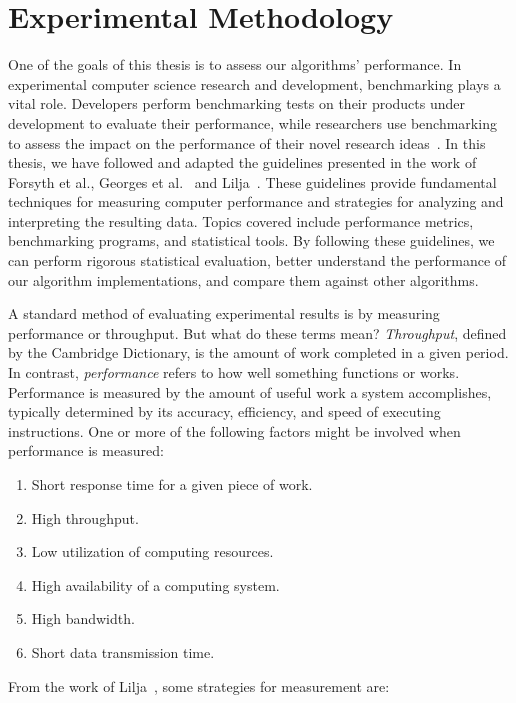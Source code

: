 \section{\label{sec:methodology}Experimental Methodology}

One of the goals of this thesis is to assess our algorithms' performance. In experimental computer science research and development, benchmarking plays a vital role. Developers perform benchmarking tests on their products under development to evaluate their performance, while researchers use benchmarking to assess the impact on the performance of their novel research ideas~\cite{DBLP_conf_oopsla_GeorgesBE07}.
In this thesis, we have followed and adapted the guidelines presented in the work of Forsyth et al.\cite{forsyth2018probability}, Georges et al.~\cite{DBLP_conf_oopsla_GeorgesBE07} and Lilja~\cite{lilja2005measuring}. These guidelines provide fundamental techniques for measuring computer performance and strategies for analyzing and interpreting the resulting data. Topics covered include performance metrics, benchmarking programs, and statistical tools. By following these guidelines, we can perform rigorous statistical evaluation, better understand the performance of our algorithm implementations, and compare them against other algorithms.

A standard method of evaluating experimental results is by measuring performance or throughput. But what do these terms mean? \emph{Throughput}, defined by the Cambridge Dictionary, is the amount of work completed in a given period. In contrast, \emph{performance} refers to how well something functions or works. Performance is measured by the amount of useful work a system accomplishes, typically determined by its accuracy, efficiency, and speed of executing instructions. One or more of the following factors might be involved when performance is measured:

\begin{enumerate}
\item Short response time for a given piece of work.
\item High throughput.
\item Low utilization of computing resources.
\item High availability of a computing system.
\item High bandwidth.
\item Short data transmission time.
\end{enumerate}

From the work of Lilja~\cite{lilja2005measuring}, some strategies for measurement are:

